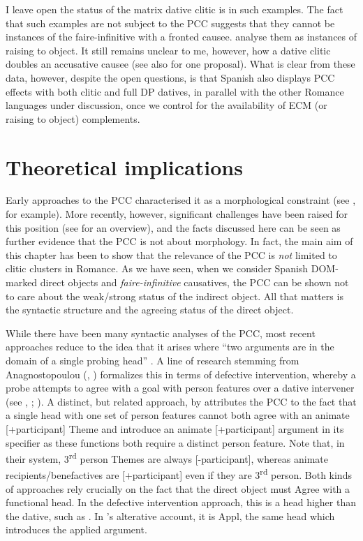 \documentclass[output=paper,colorlinks,citecolor=brown,nonflat]{langsci/langscibook}
\begin{document}
I leave open the status of the matrix dative clitic is in such examples. The fact that such examples are not subject to the PCC suggests that they cannot be instances of the faire-infinitive with a fronted causee. \citet{OrmazabalRomero2013Borealis} analyse them as instances of raising to object. It still remains unclear to me, however, how a dative clitic doubles an accusative causee (see also \citealt{OrdóñezSaab2017} for one proposal). What is clear from these data, however, despite the open questions, is that Spanish also displays PCC effects with both clitic and full DP datives, in parallel with the other Romance languages under discussion, once we control for the availability of ECM (or raising to object) complements.

\section{Theoretical implications}\label{sec:sheehan:5}

Early approaches to the PCC characterised it as a morphological constraint (see \citealt{Bonet1991}, for example). More recently, however, significant challenges have been raised for this position (see \citealt{Preminger2019} for an overview), and the facts discussed here can be seen as further evidence that the PCC is not about morphology. In fact, the main aim of this chapter has been to show that the relevance of the PCC is \textit{not} limited to clitic clusters in Romance. As we have seen, when we consider Spanish DOM-marked direct objects and \textit{faire-infinitive} causatives, the PCC can be shown not to care about the weak/strong status of the indirect object. All that matters is the syntactic structure and the agreeing status of the direct object.

While there have been many syntactic analyses of the PCC, most recent approaches reduce to the idea that it arises where “two arguments are in the domain of a single probing head” \citep[290]{Nevins2007}. A line of research stemming from Anagnostopoulou (\citeyear{Anagnostopoulou2003}, \citeyear{Anagnostopoulou2005}) formalizes this in terms of defective intervention, whereby a probe attempts to agree with a goal with person features over a dative intervener (see \citealt{Anagnostopoulou2003}, \citeyear{Anagnostopoulou2005}; \citealt{Nevins2007, Rezac2008, Preminger2019}). A distinct, but related approach, by \citet{AdgerHarbour2007} attributes the PCC to the fact that a single head with one set of person features cannot both agree with an animate [+participant] Theme and introduce an animate [+participant] argument in its specifier as these functions both require a distinct person feature. Note that, in their system, 3\textsuperscript{rd} person Themes are always [-participant], whereas animate recipients/benefactives are [+participant] even if they are 3\textsuperscript{rd} person.  Both kinds of approaches rely crucially on the fact that the direct object must Agree with a functional head. In the defective intervention approach, this is a head higher than the dative, such as \liv . In \citeauthor{AdgerHarbour2007}’s alterative account, it is Appl, the same head which introduces the applied argument.
\end{document}
